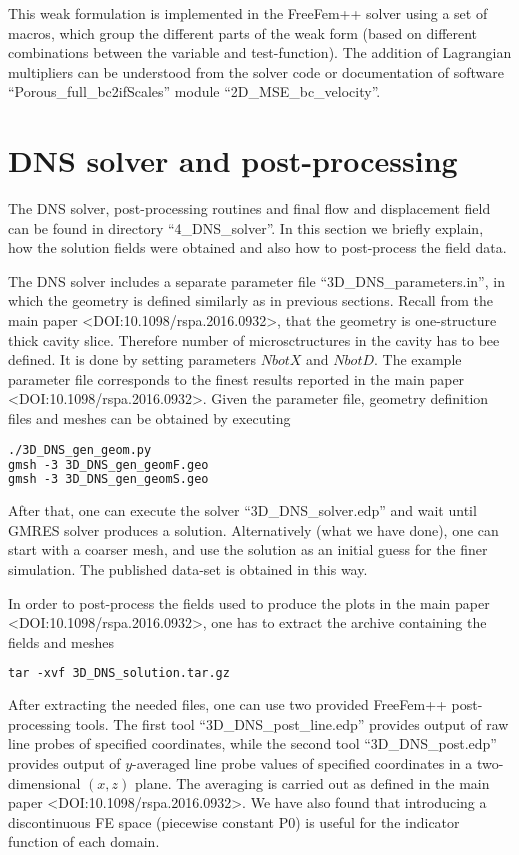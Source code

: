 \documentclass[12pt,a4paper]{article}
\begin{document}
This weak formulation is implemented in the FreeFem++ solver using a set of macros, which group the different parts of the weak form (based on different combinations between the variable and test-function). The addition of Lagrangian multipliers can be understood from the solver code or documentation of software ``Porous\_full\_bc2ifScales'' module ``2D\_MSE\_bc\_velocity''.


\section{DNS solver and post-processing}

The DNS solver, post-processing routines and final flow and displacement field can be found in directory ``4\_DNS\_solver''. In this section we briefly explain, how the solution fields were obtained and also how to post-process the field data.

The DNS solver includes a separate parameter file ``3D\_DNS\_parameters.in'', in which the geometry is defined similarly as in previous sections. Recall from the main paper <DOI:10.1098/rspa.2016.0932>, that the geometry is one-structure thick cavity slice. Therefore number of microsctructures in the cavity has to bee defined. It is done by setting parameters $NbotX$ and $NbotD$. The example parameter file corresponds to the finest results reported in the main paper <DOI:10.1098/rspa.2016.0932>. Given the parameter file, geometry definition files and meshes can be obtained by executing
\begin{lstlisting}[language=tex]
./3D_DNS_gen_geom.py
gmsh -3 3D_DNS_gen_geomF.geo
gmsh -3 3D_DNS_gen_geomS.geo
\end{lstlisting}
After that, one can execute the solver ``3D\_DNS\_solver.edp'' and wait until GMRES solver produces a solution. Alternatively (what we have done), one can start with a coarser mesh, and use the solution as an initial guess for the finer simulation. The published data-set is obtained in this way.

In order to post-process the fields used to produce the plots in the main paper <DOI:10.1098/rspa.2016.0932>, one has to extract the archive containing the fields and meshes
\begin{lstlisting}[language=tex]
tar -xvf 3D_DNS_solution.tar.gz
\end{lstlisting}

After extracting the needed files, one can use two provided FreeFem++ post-processing tools. The first tool ``3D\_DNS\_post\_line.edp'' provides output of raw line probes of specified coordinates, while the second tool ``3D\_DNS\_post.edp'' provides output of $y$-averaged line probe values of specified coordinates in a two-dimensional $(x,z)$ plane. The averaging is carried out as defined in the main paper <DOI:10.1098/rspa.2016.0932>. We have also found that introducing a discontinuous FE space (piecewise constant P0) is useful for the indicator function of each domain.
\end{document}
